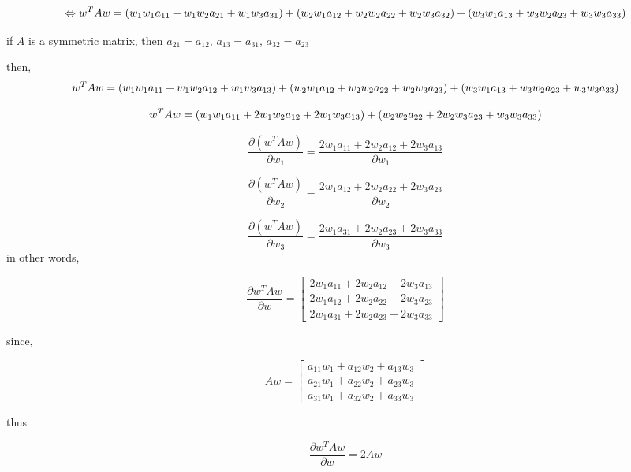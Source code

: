 $$
\Leftrightarrow w^TAw =
    (w_1w_1a_{11} + w_1w_2a_{21} + w_1w_3a_{31}) + (w_2w_1a_{12} + w_2w_2a_{22} + w_2w_3a_{32}) + (w_3w_1a_{13} + w_3w_2a_{23} + w_3w_3a_{33})\\
$$

if $A$ is a symmetric matrix, then $a_{21} = a_{12}$, $a_{13} = a_{31}$, $a_{32} = a_{23}$

then,
$$
w^TAw =
    (w_1w_1a_{11} + w_1w_2a_{12} + w_1w_3a_{13}) + (w_2w_1a_{12} + w_2w_2a_{22} + w_2w_3a_{23}) + (w_3w_1a_{13} + w_3w_2a_{23} + w_3w_3a_{33})\\
$$

$$
w^TAw =
    (w_1w_1a_{11} + 2w_1w_2a_{12} + 2w_1w_3a_{13}) + (w_2w_2a_{22} + 2w_2w_3a_{23} +w_3w_3a_{33})\\
$$

$$
\frac{\partial (w^TAw)}{\partial w_1} = \frac{2w_1a_{11} + 2w_2a_{12} + 2w_3a_{13}}{\partial w_1}
$$

$$
\frac{\partial (w^TAw)}{\partial w_2} = \frac{2w_1a_{12} + 2w_2a_{22} + 2w_3a_{23}}{\partial w_2}
$$

$$
\frac{\partial (w^TAw)}{\partial w_3} = \frac{2w_1a_{31} + 2w_2a_{23} + 2w_3a_{33}}{\partial w_3}
$$
in other words,

\begin{equation}
    \frac{\partial w^TAw}{\partial w} = 
    \begin{bmatrix}
        2w_1a_{11} + 2w_2a_{12} + 2w_3a_{13}\\
        2w_1a_{12} + 2w_2a_{22} + 2w_3a_{23}\\
        2w_1a_{31} + 2w_2a_{23} + 2w_3a_{33}
    \end{bmatrix}
\end{equation}


since,

$$
Aw = 
\begin{bmatrix}
    a_{11}w_1 + a_{12}w_2 + a_{13}w_3\\
    a_{21}w_1 + a_{22}w_2 + a_{23}w_3\\
    a_{31}w_1 + a_{32}w_2 + a_{33}w_3
\end{bmatrix}
$$

thus

\begin{equation}
    \frac{\partial w^TAw}{\partial w} = 2Aw
\end{equation}





